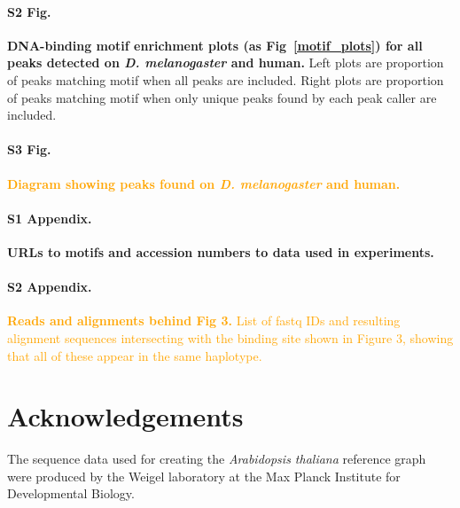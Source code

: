 \documentclass[10pt,letterpaper]{article}
\newcommand{\revision}[1]{\textcolor{orange}{#1}}
\begin{document}
\paragraph*{S2 Fig.}
\label{S2_Fig}
{\bf DNA-binding motif enrichment plots (as Fig~\ref{motif_plots}) for all peaks detected on \emph{D. melanogaster} and human.} Left plots are proportion of peaks matching motif when all peaks are included. Right plots are proportion of peaks matching motif when only unique peaks found by each peak caller are included.

\paragraph*{S3 Fig.}  
\label{S3_Fig} 
\revision{{\bf Diagram showing peaks found on \emph{D. melanogaster} and human.}}

 
\paragraph*{S1 Appendix.}
\label{S1_Appendix}
{\bf URLs to motifs and accession numbers to data used in experiments.}

\paragraph*{S2 Appendix.}
\label{S2_Appendix}
\revision{{\bf Reads and alignments behind Fig 3.} List of fastq IDs and resulting alignment sequences intersecting with the binding site shown in Figure 3, showing that all of these appear in the same haplotype.}

\section*{Acknowledgements}
The sequence data used for creating the \emph{Arabidopsis thaliana} reference graph were produced by the Weigel laboratory at the Max Planck Institute for Developmental Biology.

\nolinenumbers

%
%
% 
\end{document}
